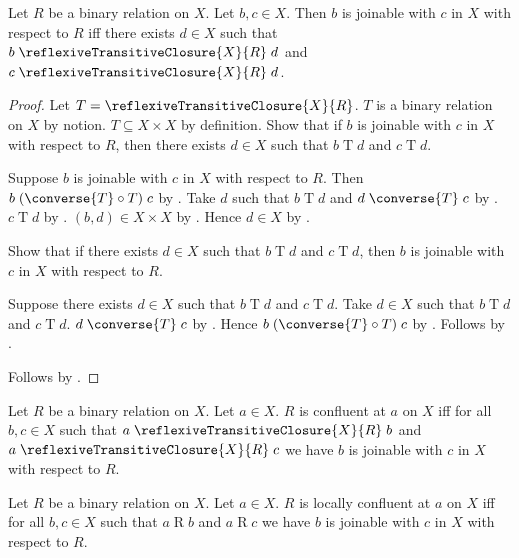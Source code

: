 \begin{proposition}\label{joinability_relation_iff}
    Let $R$ be a binary relation on $X$.
    Let $b,c\in X$.
    Then $b$ is joinable with $c$ in $X$ with respect to $R$ iff
        there exists $d\in X$ such that
            $b\mathrel{\reflexiveTransitiveClosure{X}{R}}d$ and
            $c\mathrel{\reflexiveTransitiveClosure{X}{R}}d$.
\end{proposition}
\begin{proof}
    Let $T=\reflexiveTransitiveClosure{X}{R}$.
    $T$ is a binary relation on $X$ by notion.
    $T\subseteq X\times X$ by definition.
    Show that if $b$ is joinable with $c$ in $X$ with respect to $R$, then
        there exists $d\in X$ such that $b\mathrel{T}d$ and $c\mathrel{T}d$.
    \begin{subproof}
        Suppose $b$ is joinable with $c$ in $X$ with respect to $R$.
        Then $b\mathrel{(\converse{T}\circ T)}c$
            by .
        Take $d$ such that $b\mathrel{T}d$ and
            $d\mathrel{\converse{T}}c$ by .
        $c\mathrel{T}d$ by .
        $(b,d)\in X\times X$ by .
        Hence $d\in X$ by .
    \end{subproof}
    Show that if there exists $d\in X$ such that $b\mathrel{T}d$ and
        $c\mathrel{T}d$, then
        $b$ is joinable with $c$ in $X$ with respect to $R$.
    \begin{subproof}
        Suppose there exists $d\in X$ such that $b\mathrel{T}d$ and
            $c\mathrel{T}d$.
        Take $d\in X$ such that $b\mathrel{T}d$ and $c\mathrel{T}d$.
        $d\mathrel{\converse{T}}c$ by .
        Hence $b\mathrel{(\converse{T}\circ T)}c$ by .
        Follows by .
    \end{subproof}
    Follows by \auto.
\end{proof}

\begin{definition}\label{confluent_at_on}
    Let $R$ be a binary relation on $X$.
    Let $a\in X$.
    $R$ is confluent at $a$ on $X$ iff for all $b,c\in X$ such that
        $a\mathrel{\reflexiveTransitiveClosure{X}{R}}b$ and
        $a\mathrel{\reflexiveTransitiveClosure{X}{R}}c$
        we have $b$ is joinable with $c$ in $X$ with respect to $R$.
\end{definition}

\begin{definition}\label{locally_confluent_at_on}
    Let $R$ be a binary relation on $X$.
    Let $a\in X$.
    $R$ is locally confluent at $a$ on $X$ iff for all $b,c\in X$ such that
        $a\mathrel{R}b$ and $a\mathrel{R}c$
        we have $b$ is joinable with $c$ in $X$ with respect to $R$.
\end{definition}


